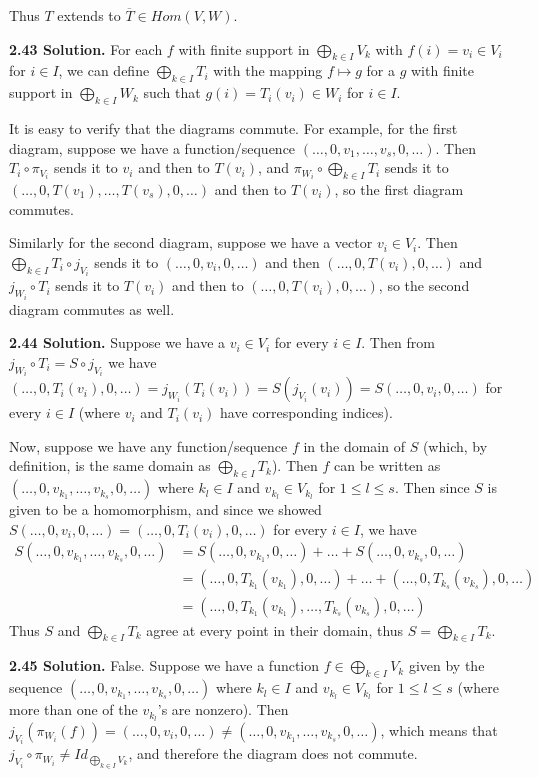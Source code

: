 Thus $T$ extends to $\overline{T}\in Hom(V,W)$.

\textbf{2.43 Solution.} For each $f$ with finite support in $\bigoplus_{k \in I}V_k$ with $f(i) = v_i \in V_i$ for $i \in I$, we can define $\bigoplus_{k \in I}T_i$ with the mapping $f \mapsto g$ for a $g$ with finite support in $\bigoplus_{k \in I}W_k$ such that $g(i) = T_i(v_i) \in W_i$ for $i \in I$. 

It is easy to verify that the diagrams commute. For example, for the first diagram, suppose we have a function/sequence $(\ldots,0,v_1,\ldots,v_s,0,\ldots)$. Then $T_i \circ \pi_{V_i}$ sends it to $v_i$ and then to $T(v_i)$, and $\pi_{W_i} \circ \bigoplus_{k \in I}T_i$ sends it to $(\ldots,0,T(v_1),\ldots,T(v_s),0,\ldots)$ and then to $T(v_i)$, so the first diagram commutes.

Similarly for the second diagram, suppose we have a vector $v_i \in V_i$. Then $\bigoplus_{k \in I}T_i \circ j_{V_i}$ sends it to $(\ldots,0,v_i,0,\ldots)$ and then $(\ldots,0,T(v_i),0,\ldots)$ and $j_{W_i} \circ T_i$ sends it to $T(v_i)$ and then to $(\ldots,0,T(v_i),0,\ldots)$, so the second diagram commutes as well.

\textbf{2.44 Solution.} Suppose we have a $v_i \in V_i$ for every $i \in I$. Then from $j_{W_i} \circ T_i = S \circ j_{V_i}$ we have $(\ldots,0,T_i(v_i),0,\ldots) = j_{W_i}(T_i(v_i)) = S(j_{V_i}(v_i)) = S(\ldots,0,v_i,0,\ldots)$ for every $i \in I$ (where $v_i$ and $T_i(v_i)$ have corresponding indices).

Now, suppose we have any function/sequence $f$ in the domain of $S$ (which, by definition, is the same domain as $\bigoplus_{k \in I}T_k$). Then $f$ can be written as $(\ldots,0,v_{k_1},\ldots,v_{k_s},0,\ldots)$ where $k_l \in I$ and $v_{k_l} \in V_{k_l}$ for $1 \leq l \leq s$. Then since $S$ is given to be a homomorphism, and since we showed $S(\ldots,0,v_i,0,\ldots) = (\ldots,0,T_i(v_i),0,\ldots)$ for every $i \in I$, we have
\begin{align*}
S(\ldots,0,v_{k_1},\ldots,v_{k_s},0,\ldots) &= S(\ldots,0,v_{k_1},0,\ldots) + \ldots + S(\ldots,0,v_{k_s},0,\ldots) \\
&= (\ldots,0,T_{k_1}(v_{k_1}),0,\ldots) + \ldots + (\ldots,0,T_{k_s}(v_{k_s}),0,\ldots) \\
&= (\ldots,0,T_{k_1}(v_{k_1}),\ldots,T_{k_s}(v_{k_s}),0,\ldots)
\end{align*}
Thus $S$ and $\bigoplus_{k \in I}T_k$ agree at every point in their domain, thus $S = \bigoplus_{k \in I}T_k$.

\textbf{2.45 Solution.} False. Suppose we have a function $f \in \bigoplus_{k \in I}V_k$ given by the sequence $(\ldots,0,v_{k_1},\ldots,v_{k_s},0,\ldots)$ where $k_l \in I$ and $v_{k_l} \in V_{k_l}$ for $1 \leq l \leq s$ (where more than one of the $v_{k_l}$'s are nonzero). Then $j_{V_i}(\pi_{W_i}(f)) = (\ldots,0,v_i,0,\ldots) \neq (\ldots,0,v_{k_1},\ldots,v_{k_s},0,\ldots)$, which means that $j_{V_i} \circ \pi_{W_i} \neq Id_{\bigoplus_{k \in I}V_k}$, and therefore the diagram does not commute.